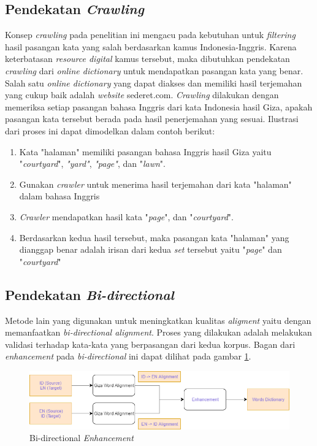 \subsection{Pendekatan \textit{Crawling}}

Konsep \textit{crawling} pada penelitian ini mengacu pada kebutuhan untuk \textit{filtering} hasil pasangan kata yang salah berdasarkan kamus Indonesia-Inggris. Karena keterbatasan \textit{resource digital} kamus tersebut, maka dibutuhkan pendekatan \textit{crawling} dari \textit{online dictionary} untuk mendapatkan pasangan kata yang benar. Salah satu \textit{online dictionary} yang dapat diakses dan memiliki hasil terjemahan yang cukup baik adalah \textit{website} sederet.com. \textit{Crawling} dilakukan dengan memeriksa setiap pasangan bahasa Inggris dari kata Indonesia hasil Giza, apakah pasangan kata tersebut berada pada hasil penerjemahan yang sesuai. Ilustrasi dari proses ini dapat dimodelkan dalam contoh berikut:

\begin{enumerate}
	\item Kata "halaman" memiliki pasangan bahasa Inggris hasil Giza yaitu  "\textit{courtyard}", \textit{"yard"}, \textit{"page"}, dan "\textit{lawn}".
	\item Gunakan \textit{crawler} untuk menerima hasil terjemahan dari kata "halaman" dalam bahasa Inggris
	\item \textit{Crawler} mendapatkan hasil kata "\textit{page}", dan "\textit{courtyard}".
	\item Berdasarkan kedua hasil tersebut, maka pasangan kata "halaman" yang dianggap benar adalah irisan dari kedua \textit{set} tersebut yaitu "\textit{page}" dan "\textit{courtyard}"
\end{enumerate}

\subsection{Pendekatan \textit{Bi-directional}}

Metode lain yang digunakan untuk meningkatkan kualitas \textit{aligment} yaitu dengan memanfaatkan \textit{bi-directional alignment}. Proses yang dilakukan adalah melakukan validasi terhadap kata-kata yang berpasangan  dari kedua korpus. Bagan dari \textit{enhancement} pada \textit{bi-directional} ini dapat dilihat pada gambar \ref{fig:Bidirectional-Enhancement}.

\begin{figure}
	\centering
	\includegraphics[width=1\linewidth]{adit_pics/bidirectional-enhancement}
	\caption{Bi-directional \textit{Enhancement}}
	\label{fig:Bidirectional-Enhancement}
\end{figure}

